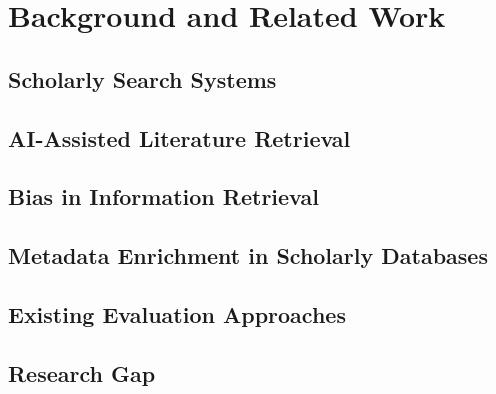 \chapter{Background and Related Work}
\label{cha:background-and-related-work}

\section{Scholarly Search Systems}

\section{AI-Assisted Literature Retrieval}

\section{Bias in Information Retrieval}

\section{Metadata Enrichment in Scholarly Databases}

\section{Existing Evaluation Approaches}

\section{Research Gap}
